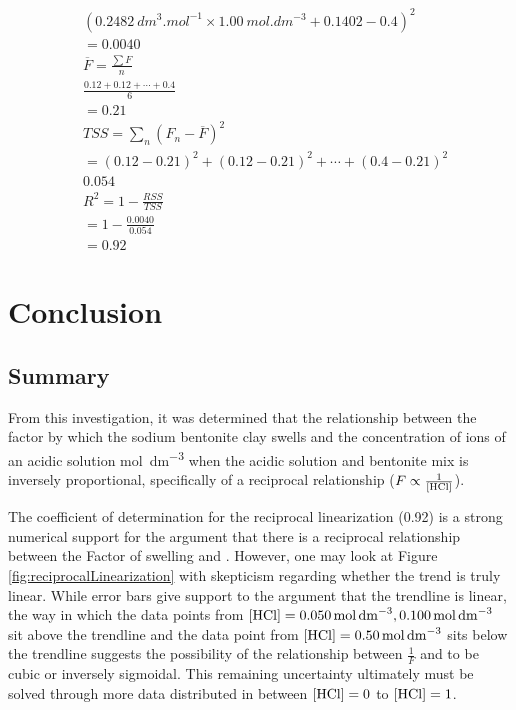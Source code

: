 \documentclass[11pt, letterpaper]{article}
\begin{document}
\begin{paracol}{2}
\begin{align*}
         & (\SI{0.2482}{dm^3.mol^{-1}}\times\SI{1.00}{mol.dm^{-3}} + 0.1402 - 0.4)^2
        \\
         & = 0.0040
        \\
         & \overline{F} = \frac{\sum F}{n}
        \\
         & \frac{0.12 + 0.12 + \cdots + 0.4}{6}
        \\
         & = 0.21
        \\
         & TSS = \sum_{n} (F_n - \overline{F})^2
        \\
         & = (0.12 - 0.21)^2 + (0.12 - 0.21)^2 + \cdots + (0.4 - 0.21)^2
        \\
         & 0.054
        \\
         & R^2 = 1 - \frac{RSS}{TSS}
        \\
         & = 1 - \frac{0.0040}{0.054}
        \\
         & = 0.92
    \end{align*}
\end{paracol}
\endgroup

\section{Conclusion}

\subsection{Summary}

From this investigation, it was determined that the relationship
between the factor by which the sodium bentonite clay swells
and the concentration of  ions of an acidic solution \unit{mol.dm^{-3}}
when the acidic solution and bentonite mix is inversely proportional, specifically
of a reciprocal relationship (\(F \propto \frac{1}{\ce{[HCl]}}\)).

The coefficient of determination for the reciprocal linearization
(0.92) is a strong numerical support for the argument that
there is a reciprocal relationship between the Factor
of swelling and \ce{[HCl]}. However, one may look at
Figure \ref*{fig:reciprocalLinearization}
with skepticism regarding whether the trend is truly linear.
While error bars give support to the argument that the
trendline is linear, the way in which the data points from
\(\ce{[HCl]} = \SI{0.050}{mol.dm^{-3}}, \SI{0.100}{mol.dm^{-3}}\)
sit above the trendline and the data point from
\(\ce{[HCl]} = \SI{0.50}{mol.dm^{-3}}\) sits below the trendline
suggests the possibility of the relationship between
\(\frac{1}{F}\) and \ce{[HCl]} to be cubic or inversely sigmoidal.
This remaining uncertainty ultimately must be solved through
more data distributed in between \(\ce{[HCl]} = 0\) to \(\ce{[HCl]} = 1\).
\end{document}
